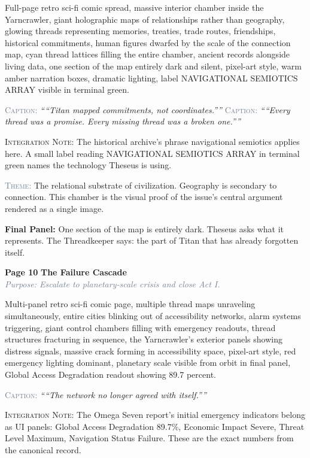 \documentclass[11pt]{article}
\newcommand{\pagecaption}[1]{\medskip\noindent\textcolor{slateGray}{\textsc{Caption:}} \textit{``#1''}\medskip}
\newcommand{\cliffhanger}[1]{\medskip\noindent\textcolor{cyanThread}{\textbf{Final Panel:}} #1\medskip}
\newcommand{\prompt}[1]{\begin{terminal}{\small #1}\end{terminal}}
\newcommand{\theme}[1]{\medskip\noindent\textcolor{slateGray}{\textsc{Theme:}} #1\medskip}
\newcommand{\integration}[1]{\medskip\noindent\textcolor{archiveGold}{\textsc{Integration Note:}} #1\medskip}
\newcommand{\pageheading}[3]{%
  \begin{pagebox}
    \noindent\textbf{\textcolor{titanOrange}{Page #1}} \hfill \textbf{\textcolor{cyanThread}{#2}}\\[2pt]
    \noindent\textcolor{slateGray}{\textit{Purpose: #3}}
  \end{pagebox}
  \medskip
}
\begin{document}
\prompt{Full-page retro sci-fi comic spread, massive interior chamber inside the Yarncrawler, giant holographic maps of relationships rather than geography, glowing threads representing memories, treaties, trade routes, friendships, historical commitments, human figures dwarfed by the scale of the connection map, cyan thread lattices filling the entire chamber, ancient records alongside living data, one section of the map entirely dark and silent, pixel-art style, warm amber narration boxes, dramatic lighting, label NAVIGATIONAL SEMIOTICS ARRAY visible in terminal green.}

\pagecaption{``Titan mapped commitments, not coordinates.''}
\pagecaption{``Every thread was a promise. Every missing thread was a broken one.''}

\integration{The historical archive's phrase navigational semiotics applies here. A small label reading NAVIGATIONAL SEMIOTICS ARRAY in terminal green names the technology Theseus is using.}

\theme{The relational substrate of civilization. Geography is secondary to connection. This chamber is the visual proof of the issue's central argument rendered as a single image.}

\cliffhanger{One section of the map is entirely dark. Theseus asks what it represents. The Threadkeeper says: the part of Titan that has already forgotten itself.}

\vspace{0.5em}

\pageheading{10}{The Failure Cascade}{Escalate to planetary-scale crisis and close Act I.}

\prompt{Multi-panel retro sci-fi comic page, multiple thread maps unraveling simultaneously, entire cities blinking out of accessibility networks, alarm systems triggering, giant control chambers filling with emergency readouts, thread structures fracturing in sequence, the Yarncrawler's exterior panels showing distress signals, massive crack forming in accessibility space, pixel-art style, red emergency lighting dominant, planetary scale visible from orbit in final panel, Global Access Degradation readout showing 89.7 percent.}

\pagecaption{``The network no longer agreed with itself.''}

\integration{The Omega Seven report's initial emergency indicators belong as UI panels: Global Access Degradation 89.7\%, Economic Impact Severe, Threat Level Maximum, Navigation Status Failure. These are the exact numbers from the canonical record.}
\end{document}
